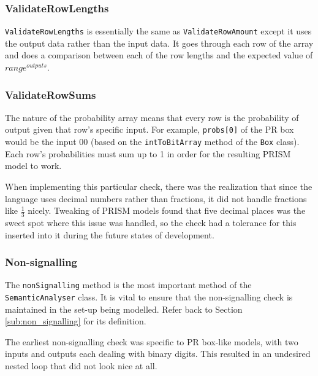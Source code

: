 \documentclass[report.tex]{subfiles}
\begin{document}
\subsubsection{ValidateRowLengths} %
\label{ssub:validaterowlengths}
\texttt{ValidateRowLengths} is essentially the same as 
\texttt{ValidateRowAmount} except it uses the output data rather than the input
data. It goes through each row of the array and does a comparison between each
of the row lengths and the expected value of \(range ^{outputs}\).

\subsubsection{ValidateRowSums} %
\label{ssub:validaterowsums}
The nature of the probability array means that every row is the probability of
output given that row's specific input. For example, \texttt{probs[0]} of the
PR box would be the input 00 (based on the \texttt{intToBitArray} method of the
\texttt{Box} class). Each row's probabilities must sum up to 1 in order for the
resulting PRISM model to work.

When implementing this particular check, there was the realization that since
the language uses decimal numbers rather than fractions, it did not handle
fractions like \(\frac{1}{3}\) nicely. Tweaking of PRISM models found that five
decimal places was the sweet spot where this issue was handled, so the check
had a tolerance for this inserted into it during the future states of
development.
\newpage
\subsubsection{Non-signalling} %
\label{ssub:non_signalling}
The \texttt{nonSignalling} method is the most important method of the
\texttt{SemanticAnalyser} class. It is vital to ensure that the non-signalling
check is maintained in the set-up being modelled. Refer back to Section
\ref{sub:non_signalling} for its definition.

The earliest non-signalling check was specific to PR box-like models, with two
inputs and outputs each dealing with binary digits. This resulted in an
undesired nested loop that did not look nice at all.


\end{document}
